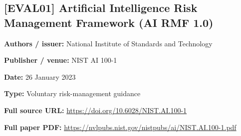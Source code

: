 \documentclass[10pt,letterpaper]{article}
\begin{document}
\subsection*{[EVAL01] Artificial Intelligence Risk Management Framework (AI RMF 1.0)}
\textbf{Authors / issuer:} National Institute of Standards and Technology\par
\textbf{Publisher / venue:} NIST AI 100-1\par
\textbf{Date:} 26 January 2023\par
\textbf{Type:} Voluntary risk-management guidance\par
\textbf{Full source URL:} \href{https://doi.org/10.6028/NIST.AI.100-1}{\small\ttfamily https:/\allowbreak{}/\allowbreak{}doi.\allowbreak{}org/\allowbreak{}10.\allowbreak{}6028/\allowbreak{}NIST.\allowbreak{}AI.\allowbreak{}100-\allowbreak{}1}\par
\textbf{Full paper PDF:} \href{https://nvlpubs.nist.gov/nistpubs/ai/NIST.AI.100-1.pdf}{\small\ttfamily https:/\allowbreak{}/\allowbreak{}nvlpubs.\allowbreak{}nist.\allowbreak{}gov/\allowbreak{}nistpubs/\allowbreak{}ai/\allowbreak{}NIST.\allowbreak{}AI.\allowbreak{}100-\allowbreak{}1.\allowbreak{}pdf}\par
\par\medskip
\end{document}
